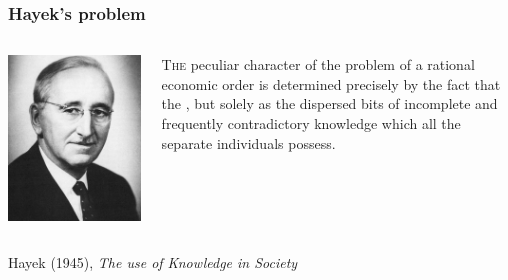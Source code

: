 \documentclass{beamer}                %
\begin{document}
\begin{frame}[label=Hayek-quote]
\frametitle{Hayek's problem\hfilll \hyperlink{Hayek-back}{}}
\begin{block}{}
\begin{columns}
\begin{column}{0.25\textwidth}
\includegraphics[width=\textwidth]{./Images/Hayek.jpg}
\end{column}
\begin{column}{0.7\textwidth}
\begin{myquote}
\lettrine[findent=3.5pt,nindent=-3pt]{T}{he} peculiar character of the problem of a rational economic order is determined precisely by the fact that the , but solely as the dispersed bits of incomplete and frequently contradictory knowledge which all the separate individuals possess.
\end{myquote}
\end{column}
\end{columns}
\flushright Hayek (1945), \emph{The use of Knowledge in Society}
\end{block}
\end{frame}

\end{document}
